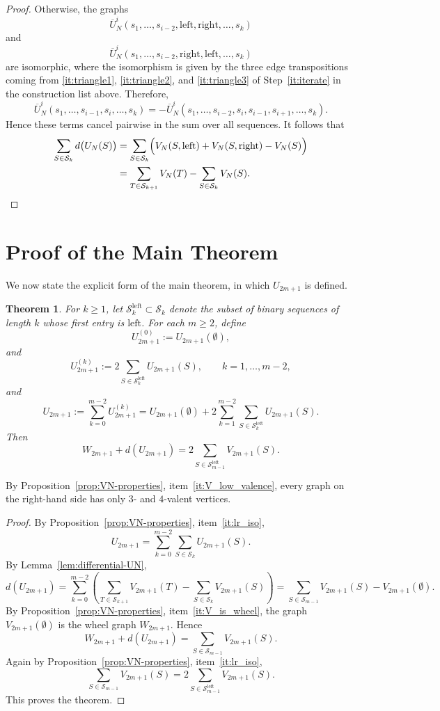 \documentclass[11pt]{article}
\theoremstyle{definition}
\theoremstyle{plain}
\newtheorem{theorem}[definition]{Theorem}
\newcommand{\LeftChoice}{\mathrm{left}}
\newcommand{\RightChoice}{\mathrm{right}}
\begin{document}
\begin{proof}
Otherwise, the graphs
\[
\overline{U}_N^i(s_1,\dots,s_{i-2},\LeftChoice,\RightChoice,\dots,s_k)
\]
and
\[
\overline{U}_N^i(s_1,\dots,s_{i-2},\RightChoice,\LeftChoice,\dots,s_k)
\]
are isomorphic, where the isomorphism is given by the three edge transpositions coming from \ref{it:triangle1}, \ref{it:triangle2}, and \ref{it:triangle3} of Step~\ref{it:iterate} in the construction list above. Therefore,
\[
\overline{U}_N^i(s_1,\dots,s_{i-1},s_i,\dots,s_k)
=
-\overline{U}_N^i(s_1,\dots,s_{i-2},s_i,s_{i-1},s_{i+1},\dots,s_k).
\]
Hence these terms cancel pairwise in the sum over all sequences. It follows that
\[
\begin{aligned}
\sum_{S \in \mathcal{S}_k} d\bigl(U_N(S)\bigr)
&= \sum_{S \in \mathcal{S}_k} \Bigl( V_N(S,\LeftChoice) + V_N(S,\RightChoice) - V_N(S) \Bigr)\\
&= \sum_{T \in \mathcal{S}_{k+1}} V_N(T) - \sum_{S \in \mathcal{S}_k} V_N(S).
\end{aligned}
\]

\end{proof}

\section{Proof of the Main Theorem}
We now state the explicit form of the main theorem, in which $U_{2m+1}$ is defined.

\begin{theorem}\label{thm:main-reduction}\label{thm:explicit-representatives}
For $k\geq 1$, let $\mathcal{S}_k^{\LeftChoice}\subset \mathcal{S}_k$ denote the subset of binary sequences of length $k$ whose first entry is $\LeftChoice$.
For each $m\geq 2$, define
\[
U_{2m+1}^{(0)}:=U_{2m+1}(\emptyset),
\]
and
\[
U_{2m+1}^{(k)}:=2\sum_{S\in \mathcal{S}_k^{\LeftChoice}} U_{2m+1}(S),
\qquad k=1,\dots,m-2,
\]
and
\[
U_{2m+1}:=\sum_{k=0}^{m-2} U_{2m+1}^{(k)}
=
U_{2m+1}(\emptyset)+2\sum_{k=1}^{m-2}\sum_{S\in \mathcal{S}_k^{\LeftChoice}} U_{2m+1}(S).
\]
Then
\[
W_{2m+1}+d(U_{2m+1})=2\sum_{S\in \mathcal{S}_{m-1}^{\LeftChoice}}V_{2m+1}(S).
\]
\end{theorem}

By Proposition~\ref{prop:VN-properties}, item~\ref{it:V_low_valence}, every graph on the right-hand side has only $3$- and $4$-valent vertices.

\begin{proof}
By Proposition~\ref{prop:VN-properties}, item~\ref{it:lr_iso},
\[
U_{2m+1}=\sum_{k=0}^{m-2}\sum_{S\in \mathcal{S}_k}U_{2m+1}(S).
\]
By Lemma~\ref{lem:differential-UN},
\[
d(U_{2m+1})
=
\sum_{k=0}^{m-2}
\left(
\sum_{T\in \mathcal{S}_{k+1}}V_{2m+1}(T)-\sum_{S\in \mathcal{S}_k}V_{2m+1}(S)
\right)
=
\sum_{S\in \mathcal{S}_{m-1}}V_{2m+1}(S)-V_{2m+1}(\emptyset).
\]
By Proposition~\ref{prop:VN-properties}, item~\ref{it:V_is_wheel}, the graph $V_{2m+1}(\emptyset)$ is the wheel graph $W_{2m+1}$. Hence
\[
W_{2m+1}+d(U_{2m+1})=\sum_{S\in \mathcal{S}_{m-1}}V_{2m+1}(S).
\]
Again by Proposition~\ref{prop:VN-properties}, item~\ref{it:lr_iso},
\[
\sum_{S\in \mathcal{S}_{m-1}}V_{2m+1}(S)
=
2\sum_{S\in \mathcal{S}_{m-1}^{\LeftChoice}}V_{2m+1}(S).
\]
This proves the theorem.
\end{proof}
\end{document}
